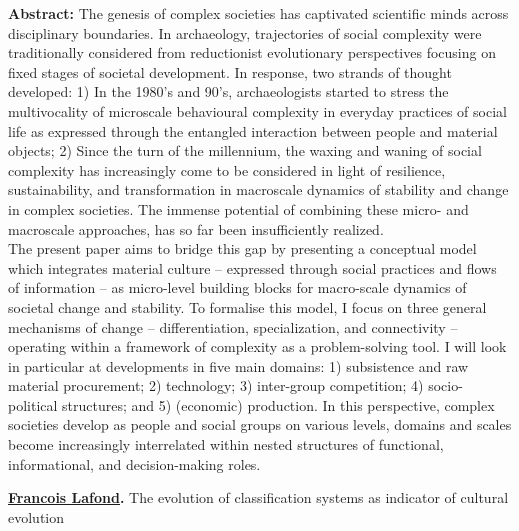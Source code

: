 \documentclass[]{article}
\begin{document}
\textbf{Abstract:} The genesis of complex societies has captivated
scientific minds across disciplinary boundaries. In archaeology,
trajectories of social complexity were traditionally considered from
reductionist evolutionary perspectives focusing on fixed stages of
societal development. In response, two strands of thought developed: 1)
In the 1980's and 90's, archaeologists started to stress the
multivocality of microscale behavioural complexity in everyday practices
of social life as expressed through the entangled interaction between
people and material objects; 2) Since the turn of the millennium, the
waxing and waning of social complexity has increasingly come to be
considered in light of resilience, sustainability, and transformation in
macroscale dynamics of stability and change in complex societies. The
immense potential of combining these micro- and macroscale approaches,
has so far been insufficiently realized.\\
The present paper aims to bridge this gap by presenting a conceptual
model which integrates material culture -- expressed through social
practices and flows of information -- as micro-level building blocks for
macro-scale dynamics of societal change and stability. To formalise this
model, I focus on three general mechanisms of change -- differentiation,
specialization, and connectivity -- operating within a framework of
complexity as a problem-solving tool. I will look in particular at
developments in five main domains: 1) subsistence and raw material
procurement; 2) technology; 3) inter-group competition; 4)
socio-political structures; and 5) (economic) production. In this
perspective, complex societies develop as people and social groups on
various levels, domains and scales become increasingly interrelated
within nested structures of functional, informational, and
decision-making roles.

{\bf \href{https://francoislafond.info}{Francois Lafond}. }{The evolution of
classification systems as indicator of cultural evolution}
\end{document}
